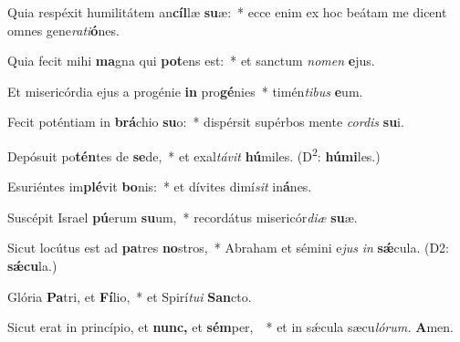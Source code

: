 \item Quia respéxit humilitátem an\textbf{cíl}læ \textbf{su}æ:~* ecce enim ex hoc beátam me dicent omnes gene\textit{rati}\textbf{ó}nes.
\item Quia fecit mihi \textbf{ma}gna qui \textbf{pot}ens est:~* et sanctum \textit{nomen} \textbf{e}jus.
\item Et misericórdia ejus a progénie \textbf{in} pro\textbf{gé}nies~* timén\textit{tibus} \textbf{e}um.
\item Fecit poténtiam in \textbf{brá}chio \textbf{su}o:~* dispérsit supérbos mente \textit{cordis} \textbf{su}i.
\item Depósuit po\textbf{tén}tes de \textbf{se}de,~* et exal\textit{távit} \textbf{hú}miles. (D\textsuperscript{2}: \textbf{húmi}les.)
\item Esuriéntes im\textbf{plé}vit \textbf{bo}nis:~* et dívites dimí\hspace{0.02em}\textit{sit} in\textbf{á}nes.
\item Suscépit Israel \textbf{pú}erum \textbf{su}um,~* recordátus misericór\textit{diæ} \textbf{su}æ.
\item Sicut locútus est ad \textbf{pa}tres \textbf{no}stros,~* Abraham et sémini e\hspace{0.02em}\textit{jus} \textit{in} \textbf{sǽ}cula. (D2: \textbf{sǽcu}la.)
\item Glória \textbf{Pa}tri, et \textbf{Fí}lio,~* et Spirí\tinyhspace\textit{tui} \textbf{San}cto.
\item Sicut erat in princípio, et \textbf{nunc,} et \textbf{sém}per, ~* et in sǽcula sæcu\tinyhspace\textit{lórum.} \textbf{A}men.